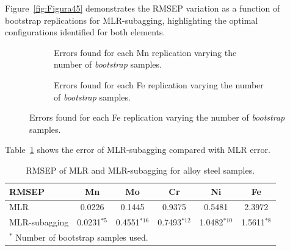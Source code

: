 \documentclass[12pt]{article}
\newcommand{\oautor}{o autor}
\begin{document}
Figure~\ref{fig:Figura45} demonstrates the RMSEP variation as a function of bootstrap replications for MLR-subagging, highlighting the optimal configurations identified for both elements.

\begin{figure}[htbp]
\centering
\caption{RMSEP as a function of \textit{bootstrap} replications for MLR-\textit{subagging}.}
\label{fig:Figura45}

\begin{subfigure}{0.48\textwidth}
\centering
{}
\caption{Errors found for each Mn replication varying the number of \textit{bootstrap} samples.}
\label{fig:Figura44a}
\end{subfigure}
\hfill
\begin{subfigure}{0.48\textwidth}
\centering
{}
\caption{Errors found for each Fe replication varying the number of \textit{bootstrap} samples.}
\label{fig:Figura44b}
\end{subfigure}
\end{figure}

Table~\ref{tab:subagging_results} shows the error of MLR-subagging compared with MLR error.

\begin{table}[H]
\centering
\caption{RMSEP of MLR and MLR-subagging for alloy steel samples.}
\label{tab:subagging_results}
\begin{tabular}{lccccc}
\toprule
RMSEP & Mn & Mo & Cr & Ni & Fe \\
\midrule
MLR & 0.0226 & 0.1445 & 0.9375 & 0.5481 & 2.3972 \\
MLR-subagging & 0.0231$^{*5}$ & 0.4551$^{*16}$ & 0.7493$^{*12}$ & 1.0482$^{*10}$ & 1.5611$^{*8}$ \\
\bottomrule
\multicolumn{6}{l}{\footnotesize $^*$ Number of bootstrap samples used.}
\end{tabular}
\end{table}
\end{document}

